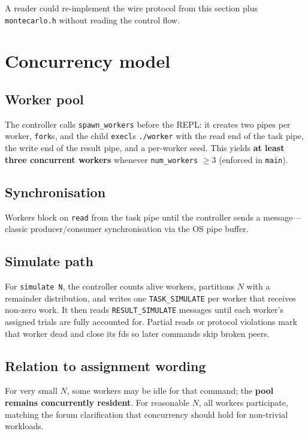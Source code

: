 \documentclass[11pt]{article}
\begin{document}
A reader could re-implement the wire protocol from this section plus \texttt{montecarlo.h} without reading the control flow.

\section{Concurrency model}
\label{sec:concurrency}

\subsection{Worker pool}
The controller calls \texttt{spawn\_workers} before the REPL: it creates two pipes per worker, \texttt{fork}s, and the child \texttt{execl}s \texttt{./worker} with the read end of the task pipe, the write end of the result pipe, and a per-worker seed. This yields \textbf{at least three concurrent workers} whenever \texttt{num\_workers} $\ge 3$ (enforced in \texttt{main}).

\subsection{Synchronisation}
Workers block on \texttt{read} from the task pipe until the controller sends a message---classic producer/consumer synchronisation via the OS pipe buffer.

\subsection{Simulate path}
For \texttt{simulate N}, the controller counts alive workers, partitions $N$ with a remainder distribution, and writes one \texttt{TASK\_SIMULATE} per worker that receives non-zero work. It then reads \texttt{RESULT\_SIMULATE} messages until each worker's assigned trials are fully accounted for. Partial reads or protocol violations mark that worker dead and close its fds so later commands skip broken peers.

\subsection{Relation to assignment wording}
For very small $N$, some workers may be idle for that command; the \textbf{pool remains concurrently resident}. For reasonable $N$, all workers participate, matching the forum clarification that concurrency should hold for non-trivial workloads.
\end{document}
